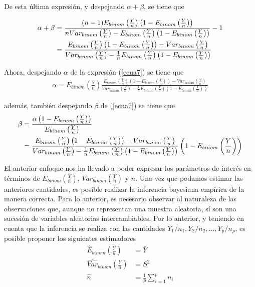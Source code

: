 \documentclass[10pt,openright]{book}\usepackage[]{graphicx}\usepackage[]{color}
\begin{document}
De esta \'ultima expresi\'on, y despejando $\alpha +\beta$, se tiene que

\begin{align}
\alpha+\beta&=\frac{(n-1)E_{binom}\left(\frac{Y}{n}\right)\left(1-E_{binom}\left(\frac{Y}{n}\right)\right)}
{nVar_{binom}\left(\frac{Y}{n}\right)-
E_{binom}\left(\frac{Y}{n}\right)\left(1-E_{binom}\left(\frac{Y}{n}\right)\right)}-1\notag \\
&=\frac{E_{binom}\left(\frac{Y}{n}\right)\left(1-E_{binom}\left(\frac{Y}{n}\right)\right)-Var_{binom}\left(\frac{Y}{n}\right)}
{Var_{binom}\left(\frac{Y}{n}\right)-\frac{1}{n}E_{binom}\left(\frac{Y}{n}\right)\left(1-E_{binom}\left(\frac{Y}{n}\right)\right)}
\end{align}

Ahora, despejando $\alpha$ de la expresi\'on (\ref{ecua7}) se tiene que
\begin{align}
\alpha=E_{binom}\left(\frac{Y}{n}\right)\frac{E_{binom}\left(\frac{Y}{n}\right)\left(1-E_{binom}\left(\frac{Y}{n}\right)\right)
-Var_{binom}\left(\frac{Y}{n}\right)}{Var_{binom}\left(\frac{Y}{n}\right)
-\frac{1}{n}E_{binom}\left(\frac{Y}{n}\right)\left(1-E_{binom}\left(\frac{Y}{n}\right)\right)}
\end{align}

adem\'as, tambi\'en despejando $\beta$ de (\ref{ecua7}) se tiene que
\begin{align}
\beta&=\frac{\alpha\left(1-E_{binom}\left(\frac{Y}{n}\right)\right)}{E_{binom}\left(\frac{Y}{n}\right)} \notag \\
&=\frac{E_{binom}\left(\frac{Y}{n}\right)\left(1-E_{binom}\left(\frac{Y}{n}\right)\right)-Var_{binom}\left(\frac{Y}{n}\right)}
{Var_{binom}\left(\frac{Y}{n}\right)-\frac{1}{n}E_{binom}\left(\frac{Y}{n}\right)\left(1-E_{binom}\left(\frac{Y}{n}\right)\right)}\left(1-E_{binom}\left(\frac{Y}{n}\right)\right)
\end{align}

El anterior enfoque nos ha llevado a poder expresar los par\'ametros de inter\'es en t\'erminos de $E_{binom}\left(\frac{Y}{n}\right)$, $Var_{binom}\left(\frac{Y}{n}\right)$ y $n$. Una vez que podamos estimar las anteriores cantidades, es posible realizar la inferencia bayesiana emp\'irica de la manera correcta. Para lo anterior, es necesario observar al naturaleza de las observaciones que, aunque no representan una muestra aleatoria, s\'i son una sucesi\'on de variables aleatorias intercambiables. Por lo anterior, y teniendo en cuenta que la inferencia se realiza con las cantidades $Y_1/n_1, Y_2/n_2, \ldots, Y_p/n_p$, es posible proponer los siguientes estimadores
\begin{align}
\hat{E}_{binom}\left(\frac{Y}{n}\right)&=\bar{Y} \\
\hat{Var}_{binom}\left(\frac{Y}{n}\right)&=S^2 \\
\hat{n}&=\frac{1}{p}\sum_{i=1}^pn_i
\end{align}
\end{document}

